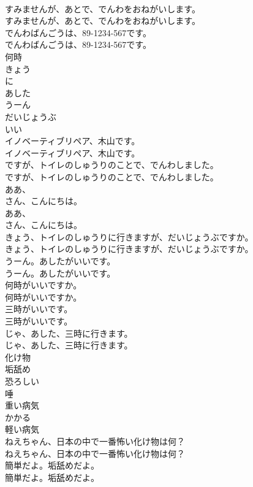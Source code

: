 \documentclass[8pt]{extreport}
\begin{document}
\begin{CJK}{UTF8}{min}
\\	すみませんが、あとで、でんわをおねがいします。	
\\	すみませんが、あとで、でんわをおねがいします。 
\\	でんわばんごうは、89-1234-567です。	
\\	でんわばんごうは、89-1234-567です。 
\\	何時
\\	きょう
\\	に
\\	あした
\\	うーん
\\	だいじょうぶ
\\	いい
\\	イノベーティブリペア、木山です。	
\\	イノベーティブリペア、木山です。 
\\	ですが、トイレのしゅうりのことで、でんわしました。	
\\	ですが、トイレのしゅうりのことで、でんわしました。 
\\	ああ、
\\	さん、こんにちは。	
\\	ああ、
\\	さん、こんにちは。 
\\	きょう、トイレのしゅうりに行きますが、だいじょうぶですか。	
\\	きょう、トイレのしゅうりに行きますが、だいじょうぶですか。 
\\	うーん。あしたがいいです。	
\\	うーん。あしたがいいです。 
\\	何時がいいですか。	
\\	何時がいいですか。 
\\	三時がいいです。	
\\	三時がいいです。 
\\	じゃ、あした、三時に行きます。	
\\	じゃ、あした、三時に行きます。 
\\	化け物
\\	垢舐め
\\	恐ろしい
\\	唾
\\	重い病気
\\	かかる
\\	軽い病気
\\	ねえちゃん、日本の中で一番怖い化け物は何？	
\\	ねえちゃん、日本の中で一番怖い化け物は何？ 
\\	簡単だよ。垢舐めだよ。	
\\	簡単だよ。垢舐めだよ。 

\end{CJK}
\end{document}

